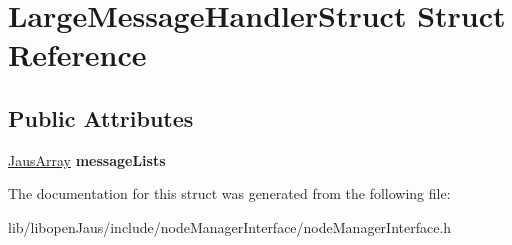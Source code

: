 \hypertarget{struct_large_message_handler_struct}{\section{\-Large\-Message\-Handler\-Struct \-Struct \-Reference}
\label{struct_large_message_handler_struct}
}
\subsection*{\-Public \-Attributes}
\begin{DoxyCompactItemize}
\item 
\hypertarget{struct_large_message_handler_struct_a103833bde84e8119ce0844b04459868a}{\hyperlink{struct_jaus_array_struct}{\-Jaus\-Array} {\bfseries message\-Lists}}\label{struct_large_message_handler_struct_a103833bde84e8119ce0844b04459868a}

\end{DoxyCompactItemize}


\-The documentation for this struct was generated from the following file\-:\begin{DoxyCompactItemize}
\item 
lib/libopen\-Jaus/include/node\-Manager\-Interface/node\-Manager\-Interface.\-h\end{DoxyCompactItemize}
